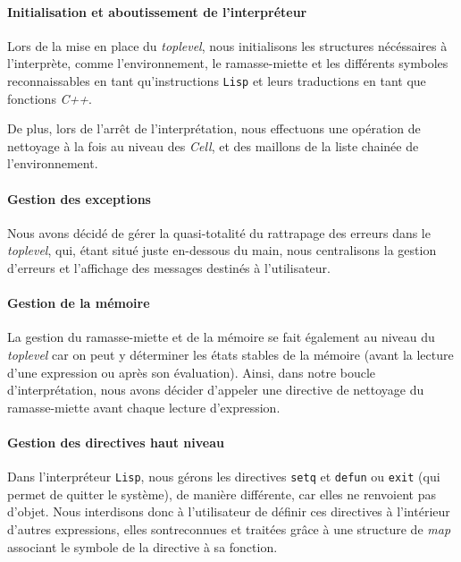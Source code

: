 \paragraph{Initialisation et aboutissement de l'interpréteur}
Lors de la mise en place du \emph{toplevel}, nous initialisons les structures nécéssaires à
l'interprète, comme l'environnement, le ramasse-miette et les différents symboles reconnaissables en tant
qu'instructions \texttt{Lisp} et leurs traductions en tant que
fonctions \emph{C++}.

De plus, lors de l'arrêt de l'interprétation, nous effectuons une
opération de nettoyage à la fois au niveau des \emph{Cell}, et des maillons de la liste chainée de l'environnement.\\

\paragraph{Gestion des exceptions}
Nous avons décidé de gérer la quasi-totalité du rattrapage des erreurs
dans le \emph{toplevel}, qui, étant situé juste en-dessous du main, nous centralisons la gestion
d'erreurs et l'affichage des messages destinés à l'utilisateur.

\paragraph{Gestion de la mémoire}
La gestion du ramasse-miette et de la mémoire se fait également au niveau du
\emph{toplevel} car on peut y déterminer les états stables de la mémoire (avant
la lecture d'une expression ou après son évaluation). Ainsi, dans notre boucle
d'interprétation, nous avons décider d'appeler une directive de nettoyage du
ramasse-miette avant chaque lecture d'expression.

\paragraph{Gestion des directives haut niveau}
Dans l'interpréteur \texttt{Lisp}, nous gérons les directives \texttt{setq} et
\texttt{defun} ou \texttt{exit} (qui permet de quitter le système), de manière
différente, car elles ne renvoient pas d'objet. Nous interdisons donc à
l'utilisateur de définir ces directives à l'intérieur d'autres expressions,
elles sontreconnues et traitées grâce à une structure de \emph{map} associant le
symbole de la directive à sa fonction.
